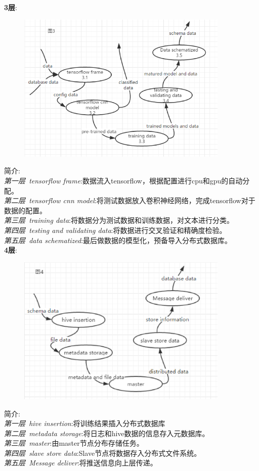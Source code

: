\documentclass[UTF8]{ctexart}
\begin{document}
\textbf{3层}:\\
\begin{figure}[H]
\centering
\includegraphics[width = 0.9\textwidth]{recommend3-df.png}
\end{figure}
简介:\\
\emph{第一层~tensorflow frame}:数据流入tensorflow，根据配置进行cpu和gpu的自动分配。\\
\emph{第二层~tensorflow cnn model}:将测试数据放入卷积神经网络，完成tensorflow对于数据的配置。\\
\emph{第三层~training data}:将数据分为测试数据和训练数据，对文本进行分类。\\
\emph{第四层~testing and validating data}:将数据进行交叉验证和精确度检验。\\
\emph{第五层~data schematized}:最后做数据的模型化，预备导入分布式数据库。\\

\textbf{4层}:\\
\begin{figure}[H]
\centering
\includegraphics[width = 0.9\textwidth]{recommend4-df.png}
\end{figure}
简介:\\
\emph{第一层~hive insertion}:将训练结果插入分布式数据库\\
\emph{第二层~metadata storage}:将日志和hive数据的信息存入元数据库。\\
\emph{第三层~master}:由master节点分布存储任务。\\
\emph{第四层~slave store data}:Slave节点将数据存入分布式文件系统。\\
\emph{第五层~Message deliver}:将推送信息向上层传递。\\
\end{document}
